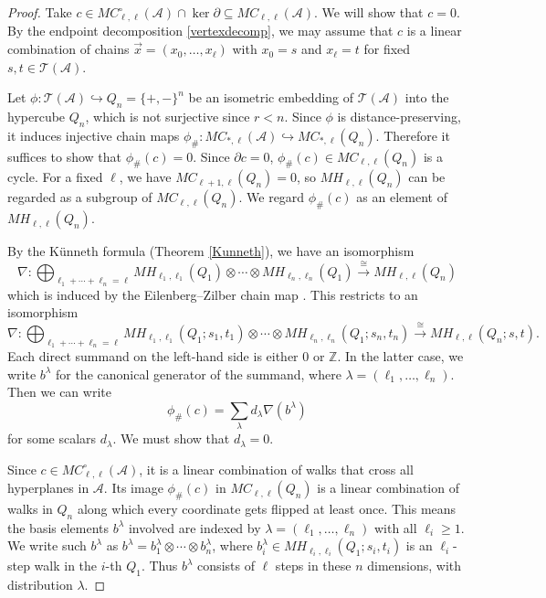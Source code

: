 \documentclass{amsart}
\numberwithin{equation}{section}
\theoremstyle{plain}
\theoremstyle{remark}
\theoremstyle{definition}
\numberwithin{equation}{section}
\newcommand{\A}{\mathcal{A}}
\newcommand{\T}{\mathcal{T}}
\begin{document}
\begin{proof}
    Take $c\in MC_{\ell,\ell}^{\circ}(\A)\cap\ker\partial\subseteq MC_{\ell,\ell}(\A)$.
    We will show that $c=0$.
    By the endpoint decomposition \eqref{vertexdecomp}, we may assume that $c$ is a linear combination of chains $\vec{x}=(x_0,\dots,x_\ell)$ with $x_0=s$ and $x_\ell=t$ for fixed $s,t\in \T(\A)$.
    
    Let $\phi:\T(\A)\hookrightarrow Q_{n}=\{+,-\}^n$ be an isometric embedding of $\T(\A)$ into the hypercube $Q_n$, which is not surjective since $r<n$. Since $\phi$ is distance-preserving, it induces injective chain maps $\phi_{\#}:MC_{*,\ell}(\A)\hookrightarrow MC_{*,\ell}(Q_n)$.
    Therefore it suffices to show that $\phi_\#(c)=0$.
    Since $\partial c=0$, $\phi_{\#}(c)\in MC_{\ell,\ell}(Q_n)$ is a cycle. For a fixed $\ell$, we have $MC_{\ell+1,\ell}(Q_n)=0$, so $MH_{\ell,\ell}(Q_n)$ can be regarded as a subgroup of $MC_{\ell,\ell}(Q_n)$.
    We regard $\phi_{\#}(c)$ as an element of $MH_{\ell,\ell}(Q_n)$.

    By the K\"unneth formula (Theorem \ref{Kunneth}), we have an isomorphism
    \[
    \nabla:\bigoplus_{\ell_1+\cdots+\ell_n=\ell}MH_{\ell_1,\ell_1}(Q_1)\otimes\cdots\otimes MH_{\ell_n,\ell_n}(Q_1) \xrightarrow{\cong}MH_{\ell,\ell}(Q_n)
    \]
    which is induced by the Eilenberg--Zilber chain map \cite{Hepworth2017}.
    This restricts to an isomorphism
    \[
    \nabla:\bigoplus_{\ell_1+\cdots+\ell_n=\ell}MH_{\ell_1,\ell_1}(Q_1;s_1,t_1)\otimes\cdots\otimes MH_{\ell_n,\ell_n}(Q_1;s_n,t_n) \xrightarrow{\cong}MH_{\ell,\ell}(Q_n;s,t).
    \]
    Each direct summand on the left-hand side is either $0$ or $\mathbb{Z}$.
    In the latter case, we write $b^\lambda$ for the canonical generator of the summand, where $\lambda=(\ell_1,\ldots,\ell_n)$.
    Then we can write
    \[
    \phi_{\#}(c)=\sum_{\lambda}d_{\lambda}\nabla(b^{\lambda})
    \]
    for some scalars $d_{\lambda}$. We must show that $d_{\lambda}=0$.
    
    Since $c\in MC_{\ell,\ell}^{\circ}(\A)$, it is a linear combination of walks that cross all hyperplanes in $\A$. Its image $\phi_{\#}(c)$ in $MC_{\ell,\ell}(Q_n)$ is a linear combination of walks in $Q_n$ along which every coordinate gets flipped at least once. This means the basis elements $b^{\lambda}$ involved are indexed by $\lambda=(\ell_1,\ldots,\ell_n)$ with all $\ell_i\geq 1$. We write such $b^{\lambda}$ as $b^\lambda=b_1^{\lambda}\otimes\cdots\otimes b_n^{\lambda}$, where $b_i^{\lambda}\in MH_{\ell_i,\ell_i}(Q_1;s_i,t_i)$ is an $\ell_i$-step walk in the $i$-th $Q_1$. Thus $b^{\lambda}$ consists of $\ell$ steps in these $n$ dimensions, with distribution $\lambda$.
    

\end{proof}
\end{document}

